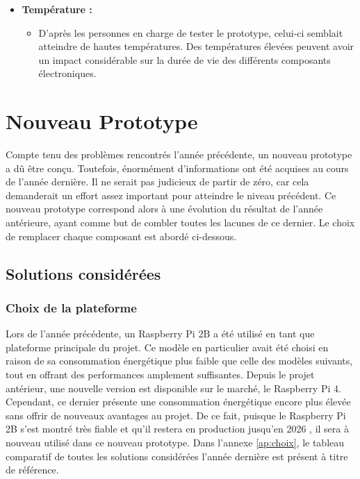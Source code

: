 \begin{itemize}
~

  \item \textbf{Température :}
  \begin{itemize}
    \item D'après les personnes en charge de tester le prototype, celui-ci semblait atteindre de hautes températures. Des températures élevées peuvent avoir un impact considérable sur la durée de vie des différents composants électroniques.
  \end{itemize}
\end{itemize}


\section{Nouveau Prototype}

\noindent
Compte tenu des problèmes rencontrés l'année précédente, un nouveau prototype a dû être conçu. Toutefois, énormément d'informations ont été acquises au cours de l'année dernière. Il ne serait pas judicieux de partir de zéro, car cela demanderait un effort assez important pour atteindre le niveau précédent. Ce nouveau prototype correspond alors à une évolution du résultat de l'année antérieure, ayant comme but de combler toutes les lacunes de ce dernier. Le choix de remplacer chaque composant est abordé ci-dessous.

\subsection{Solutions considérées}
\label{sec:sol_hard}

\subsubsection{Choix de la plateforme}

\noindent
Lors de l'année précédente, un Raspberry Pi 2B a été utilisé en tant que plateforme principale du projet. Ce modèle en particulier avait été choisi en raison de sa consommation énergétique plus faible que celle des modèles suivants, tout en offrant des performances amplement suffisantes. Depuis le projet antérieur, une nouvelle version est disponible sur le marché, le Raspberry Pi 4. Cependant, ce dernier présente une consommation énergétique encore plus élevée sans offrir de nouveaux avantages au projet. De ce fait, puisque le Raspberry Pi 2B s'est montré très fiable et qu'il restera en production jusqu'en 2026 \cite{rasp_prod}, il sera à nouveau utilisé dans ce nouveau prototype. Dans l'annexe \ref{ap:choix}, le tableau comparatif de toutes les solutions considérées l'année dernière est présent à titre de référence.


